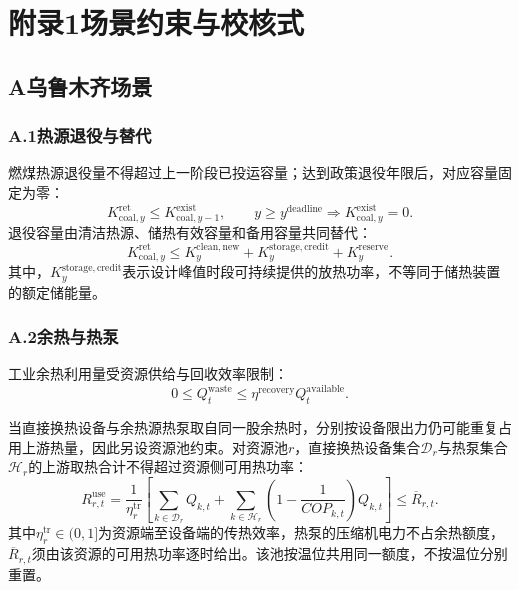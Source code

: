 \clearpage
\section*{附录1\quad 场景约束与校核式}

\subsection*{A\quad 乌鲁木齐场景}

\subsubsection*{A.1\quad 热源退役与替代}

燃煤热源退役量不得超过上一阶段已投运容量；达到政策退役年限后，对应容量固定为零：
\begin{equation}
K_{\mathrm{coal},y}^{\mathrm{ret}}\leq K_{\mathrm{coal},y-1}^{\mathrm{exist}},
\qquad y\geq y^{\mathrm{deadline}}\Rightarrow K_{\mathrm{coal},y}^{\mathrm{exist}}=0.
\end{equation}
退役容量由清洁热源、储热有效容量和备用容量共同替代：
\begin{equation}
K_{\mathrm{coal},y}^{\mathrm{ret}}\leq
K_y^{\mathrm{clean,new}}+K_y^{\mathrm{storage,credit}}+K_y^{\mathrm{reserve}}.
\end{equation}
其中，$K_y^{\mathrm{storage,credit}}$表示设计峰值时段可持续提供的放热功率，不等同于储热装置的额定储能量。

\subsubsection*{A.2\quad 余热与热泵}

工业余热利用量受资源供给与回收效率限制：
\begin{equation}
0\leq Q_t^{\mathrm{waste}}\leq\eta^{\mathrm{recovery}}Q_t^{\mathrm{available}}.
\end{equation}

当直接换热设备与余热源热泵取自同一股余热时，分别按设备限出力仍可能重复占用上游热量，因此另设资源池约束。对资源池$r$，直接换热设备集合$\mathcal D_r$与热泵集合$\mathcal H_r$的上游取热合计不得超过资源侧可用热功率：
\begin{equation}
R_{r,t}^{\mathrm{use}}
=\frac{1}{\eta_r^{\mathrm{tr}}}\left[
\sum_{k\in\mathcal D_r}Q_{k,t}
+\sum_{k\in\mathcal H_r}\left(1-\frac{1}{COP_{k,t}}\right)Q_{k,t}
\right]\leq\overline R_{r,t}.
\label{eq:waste-pool}
\end{equation}
其中$\eta_r^{\mathrm{tr}}\in(0,1]$为资源端至设备端的传热效率，热泵的压缩机电力不占余热额度，$\overline R_{r,t}$须由该资源的可用热功率逐时给出。该池按温位共用同一额度，不按温位分别重置。


